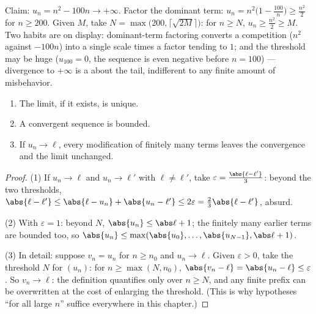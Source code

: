 \begin{example}\label{ex:b1:seq:toinfinity}
Claim: $u_n = n^2 - 100n \to +\infty$. Factor the dominant term:
$u_n = n^2\bigl(1 - \frac{100}{n}\bigr) \geq \frac{n^2}{2}$ for
$n \geq 200$. Given $M$, take $N = \max\bigl(200,
\lceil\sqrt{2M}\rceil\bigr)$: for $n \geq N$, $u_n \geq
\frac{n^2}{2} \geq M$. Two habits are on display: dominant-term
factoring converts a competition ($n^2$ against $-100n$) into a
single scale times a factor tending to $1$; and the threshold
may be huge ($u_{100} = 0$, the sequence is even negative before
$n = 100$) --- divergence to $+\infty$ is a  about the
tail, indifferent to any finite amount of misbehavior.
\end{example}

\begin{proposition}\label{prop:b1:seq:first}
\begin{enumerate}
  \item The limit, if it exists, is unique.
  \item A convergent sequence is bounded.
  \item If $u_n \to \ell$, every modification of finitely many terms
        leaves the convergence and the limit unchanged.
\end{enumerate}
\end{proposition}

\begin{proof}
(1) If $u_n \to \ell$ and $u_n \to \ell'$ with $\ell \neq \ell'$,
take $\varepsilon = \frac{\abs{\ell - \ell'}}{3}$: beyond the two
thresholds, $\abs{\ell - \ell'} \leq \abs{\ell - u_n} + \abs{u_n -
\ell'} \leq 2\varepsilon = \frac23 \abs{\ell - \ell'}$, absurd.

(2) With $\varepsilon = 1$: beyond $N$, $\abs{u_n} \leq \abs\ell +
1$; the finitely many earlier terms are bounded too, so $\abs{u_n}
\leq \max(\abs{u_0}, \dots, \abs{u_{N-1}}, \abs\ell + 1)$.

(3) In detail: suppose $v_n = u_n$ for $n \geq n_0$ and $u_n \to
\ell$. Given $\varepsilon > 0$, take the threshold $N$ for
$(u_n)$: for $n \geq \max(N, n_0)$, $\abs{v_n - \ell} = \abs{u_n
- \ell} \leq \varepsilon$. So $v_n \to \ell$: the definition
quantifies only over $n \geq N$, and any finite prefix can be
overwritten at the cost of enlarging the threshold. (This is why
hypotheses ``for all large $n$'' suffice everywhere in this
chapter.)
\end{proof}

